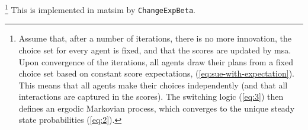 \footnote{%
%
%
%
%
%
%
%
Assume that, after a number of iterations, there is no more
innovation, \ie the choice set for every agent is fixed, and that
the scores are updated by \gls{msa}.
Upon convergence of the iterations, all agents draw their plans from
a fixed choice set based on constant score expectations, 
\cf (\ref{eq:sue-with-expectation}).
This means that all agents make their choices independently
(and that all interactions are captured in the scores).
The switching logic (\ref{eq:3}) then defines an ergodic Markovian process,
which converges to the unique steady state probabilities (\ref{eq:2}).
%
}
%
This is implemented in \gls{matsim} by \lstinline{ChangeExpBeta}.

